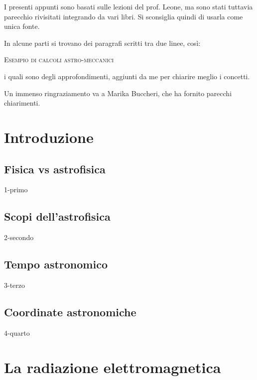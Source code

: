\documentclass[openany,12pt]{article}
\begin{document}
  I presenti appunti sono basati sulle lezioni del prof. Leone, ma sono stati tuttavia parecchio rivisitati integrando da vari libri. Si sconsiglia quindi di usarla come unica fonte.

  In alcune parti si trovano dei paragrafi scritti tra due linee, così:

  \hrulefill

  \begin{center}
    \textsc{Esempio di calcoli astro-meccanici}
  \end{center}

  \hrulefill

  i quali sono degli approfondimenti, aggiunti da me per chiarire meglio i concetti.

  Un immenso ringraziamento va a Marika Buccheri, che ha fornito parecchi chiarimenti.

  \newpage

  \section{Introduzione}

  \subsection{Fisica vs astrofisica}
    {1-primo}

    \subsection{Scopi dell'astrofisica}
    {2-secondo}

    \subsection{Tempo astronomico}
    {3-terzo}

    \subsection{Coordinate astronomiche}
    {4-quarto}

  \newpage

  \section{La radiazione elettromagnetica}
\end{document}
